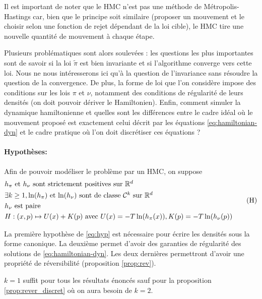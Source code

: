 \documentclass[10pt,a4paper]{article}
\begin{document}
Il est important de noter que le HMC n'est pas une méthode de Métropolis-Hastings car, bien que le principe soit similaire (proposer un mouvement et le choisir selon une fonction de rejet dépendant de la loi cible), le HMC tire une nouvelle quantité de mouvement à chaque étape.

Plusieurs problématiques sont alors soulevées : les questions les plus importantes sont de savoir si la loi $\widetilde{\pi}$ est bien invariante et si l'algorithme converge vers cette loi. Nous ne nous intéresserons ici qu'à la question de l'invariance sans résoudre la question de la convergence. De plus, la forme de loi que l'on considère impose des conditions sur les lois $\pi$ et $\nu$, notamment des conditions de régularité de leurs densités (on doit pouvoir dériver le Hamiltonien). Enfin, comment simuler la dynamique hamiltonienne et quelles sont les différences entre le cadre idéal où le mouvement proposé est exactement celui décrit par les équations \eqref{eq:hamiltonian-dyn} et le cadre pratique où l'on doit discrétiser ces équations ?

\paragraph{Hypothèses:}
Afin de pouvoir modéliser le problème par un HMC, on suppose
\begin{equation}\label{eq:hyp}
	\begin{aligned}
		&\mbox{$h_\pi$ et $h_\nu$ sont strictement positives sur $\mathbb{R}^d$} \\
		&\mbox{$\exists k \geq 1, \ln(h_\pi)$ et $\ln(h_\nu)$ sont de classe $\mathcal{C}^k$ sur $\mathbb{R}^d$}\\
		&\mbox{$h_\nu$ est paire} \\
                & H : (x,p) \mapsto U(x) + K(p) \text{ avec } U(x) = - T \ln(h_\pi(x)), K(p) = -T \ln(h_\nu(p))
	\end{aligned}
	\tag{H}
\end{equation}

\begin{Rque}
	La première hypothèse de \eqref{eq:hyp} est nécessaire pour écrire les densités sous la forme canonique. La deuxième permet d'avoir des garanties de régularité des solutions de \eqref{eq:hamiltonian-dyn}. Les deux dernières permettront d'avoir une propriété de réversibilité (proposition \ref{prop:rev}).

	$k = 1$ suffit pour tous les résultats énoncés sauf pour la proposition \ref{prop:rever_discret} où on aura besoin de $k = 2$.
\end{Rque}
\end{document}
